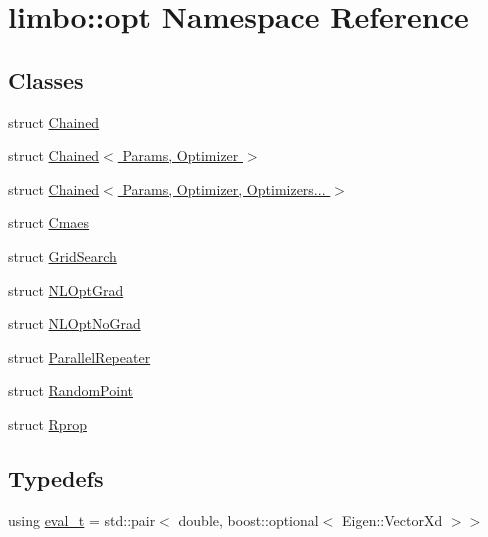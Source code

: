 \hypertarget{namespacelimbo_1_1opt}{}\section{limbo\+:\+:opt Namespace Reference}
\label{namespacelimbo_1_1opt}
\subsection*{Classes}
\begin{DoxyCompactItemize}
\item 
struct \hyperlink{structlimbo_1_1opt_1_1_chained}{Chained}
\item 
struct \hyperlink{structlimbo_1_1opt_1_1_chained_3_01_params_00_01_optimizer_01_4}{Chained$<$ Params, Optimizer $>$}
\item 
struct \hyperlink{structlimbo_1_1opt_1_1_chained_3_01_params_00_01_optimizer_00_01_optimizers_8_8_8_01_4}{Chained$<$ Params, Optimizer, Optimizers... $>$}
\item 
struct \hyperlink{structlimbo_1_1opt_1_1_cmaes}{Cmaes}
\item 
struct \hyperlink{structlimbo_1_1opt_1_1_grid_search}{Grid\+Search}
\item 
struct \hyperlink{structlimbo_1_1opt_1_1_n_l_opt_grad}{N\+L\+Opt\+Grad}
\item 
struct \hyperlink{structlimbo_1_1opt_1_1_n_l_opt_no_grad}{N\+L\+Opt\+No\+Grad}
\item 
struct \hyperlink{structlimbo_1_1opt_1_1_parallel_repeater}{Parallel\+Repeater}
\item 
struct \hyperlink{structlimbo_1_1opt_1_1_random_point}{Random\+Point}
\item 
struct \hyperlink{structlimbo_1_1opt_1_1_rprop}{Rprop}
\end{DoxyCompactItemize}
\subsection*{Typedefs}
\begin{DoxyCompactItemize}
\item 
using \hyperlink{group__opt__tools_ga362b55973a38ac71f27a06f9d9c14f24}{eval\+\_\+t} = std\+::pair$<$ double, boost\+::optional$<$ Eigen\+::\+Vector\+Xd $>$$>$
\end{DoxyCompactItemize}
